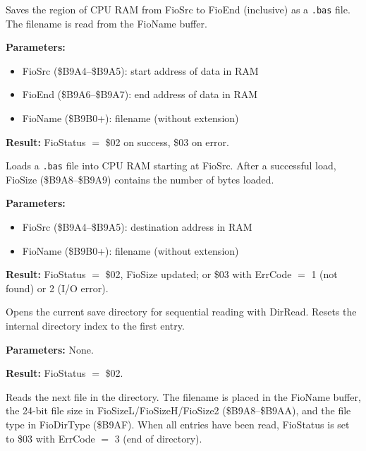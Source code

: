 
Saves the region of CPU RAM from FioSrc to FioEnd (inclusive) as a
\texttt{.bas} file.  The filename is read from the FioName buffer.

\textbf{Parameters:}
\begin{itemize}
  \item FioSrc (\$B9A4--\$B9A5): start address of data in RAM
  \item FioEnd (\$B9A6--\$B9A7): end address of data in RAM
  \item FioName (\$B9B0+): filename (without extension)
\end{itemize}

\textbf{Result:} FioStatus $=$ \$02 on success, \$03 on error.

\medskip


Loads a \texttt{.bas} file into CPU RAM starting at FioSrc.  After a
successful load, FioSize (\$B9A8--\$B9A9) contains the number of bytes
loaded.

\textbf{Parameters:}
\begin{itemize}
  \item FioSrc (\$B9A4--\$B9A5): destination address in RAM
  \item FioName (\$B9B0+): filename (without extension)
\end{itemize}

\textbf{Result:} FioStatus $=$ \$02, FioSize updated; or \$03 with
ErrCode $=$ 1 (not found) or 2 (I/O error).

\medskip


Opens the current save directory for sequential reading with DirRead.
Resets the internal directory index to the first entry.

\textbf{Parameters:} None.

\textbf{Result:} FioStatus $=$ \$02.

\medskip


Reads the next file in the directory.  The filename is placed in the FioName
buffer, the 24-bit file size in FioSizeL/FioSizeH/FioSize2
(\$B9A8--\$B9AA), and the file type in FioDirType (\$B9AF).  When all entries
have been read, FioStatus is set to \$03 with ErrCode $=$ 3 (end of
directory).

